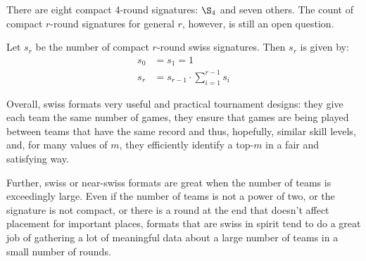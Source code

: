 {There are eight compact 4-round signatures: $\S_4$ and seven others. The count of compact $r$-round signatures for general $r$, however, is still an open question. %

\begin{conj}{}{}
    Let $s_r$ be the number of compact $r$-round swiss signatures. Then $s_r$ is given by:
    \begin{align*}
        s_0 &= s_ 1 = 1\\
        s_r &= s_{r-1} \cdot \sum_{i=1}^{r-1}s_i
    \end{align*}
\end{conj}

Overall, swiss formats very useful and practical tournament designs: they give each team the same number of games, they ensure that games are being played between teams that have the same record and thus, hopefully, similar skill levels, and, for many values of $m$, they efficiently identify a top-$m$ in a fair and satisfying way.

Further, swiss or near-swiss formats are great when the number of teams is exceedingly large. Even if the number of teams is not a power of two, or the signature is not compact, or there is a round at the end that doesn't affect placement for important places, formats that are swiss in spirit tend to do a great job of gathering a lot of meaningful data about a large number of teams in a small number of rounds.
}